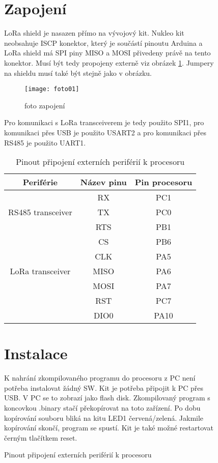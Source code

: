 \begin{figure}[!h]
\newpage
\section{Zapojení}
LoRa shield \cite{draginoWiki} je nasazen přímo na vývojový kit. 
Nukleo kit neobsahuje ISCP konektor, který je součástí pinoutu Arduina a LoRa shield má SPI piny MISO a MOSI přivedeny právě na tento konektor. Musí být tedy propojeny externě viz obrázek \ref{fig:03}.
Jumpery na shieldu musí také být stejně jako v obrázku.

\begin{figure}[!h]
    \centering
    \texttt{[image: foto01]}
    \caption{foto zapojení}
    \label{fig:03}
\end{figure}


Pro komunikaci s LoRa transceiverem je tedy použito SPI1, pro komunikaci přes USB je použito USART2 a pro komunikaci přes RS485 je použito UART1.


\begin{table}[h]
    \centering
    \begin{tabular}{ |c|c|c| }
     \hline

     Periférie          & Název pinu & Pin procesoru           \\ \hline \hline
     
                        & RX  &   PC1            \\
    RS485 transceiver   & TX  &   PC0       \\
                        & RTS  &  PB1      \\     \hline

                        & CS    &  PB6             \\
                        & CLK   &  PA5        \\
   LoRa transceiver     & MISO  &  PA6     \\
                        & MOSI  &  PA7        \\
                        & RST   & PC7          \\
                        & DIO0  & PA10         \\
                        \hline

    \end{tabular}
    \caption{Pinout připojení externích periférií k procesoru}
    \label{table:3}
\end{table}


\section{Instalace}
K nahrání zkompilovaného programu do procesoru z PC není potřeba instalovat žádný SW. 
Kit je potřeba připojit k PC přes USB. V PC se to zobrazí jako flash disk. Zkompilovaný program s koncovkou .binary stačí překopírovat na toto zařízení. Po dobu kopírování souboru bliká na kitu LED1 červená/zelená. Jakmile kopírování skončí, program se spustí. Kit je také možné restartovat černým tlačítkem reset.


\end{figure}
